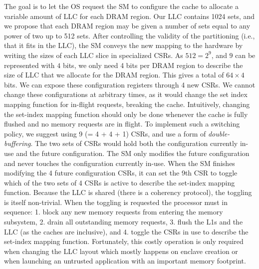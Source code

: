 The goal is to let the OS request the SM to configure the cache to allocate a variable amount of LLC for each DRAM region. Our LLC contains 1024 sets, and we propose that each DRAM region may be given a number of sets equal to any power of two up to 512 sets.
After controlling the validity of the partitioning (i.e., that it fits in the LLC), the SM conveys the new mapping to the hardware by writing the sizes of each LLC slice in specialized CSRs.
As $512=2^9$, and $9$ can be represented with $4$ bits,  we only need 4 bits per DRAM region to describe the size of LLC that we allocate for the DRAM region. This gives a total of $64 \times 4$ bits. We can expose these configuration registers through 4 new CSRs.
We cannot change these configurations at arbitrary times, as it would change the set index mapping function for in-flight requests, breaking the cache.
Intuitively, changing the set-index mapping function should only be done whenever the cache is fully flushed and no memory requests are in flight.
To implement such a switching policy, we suggest using 9 (= 4 + 4 + 1) CSRs, and use a form of \emph{double-buffering}.
The two sets of CSRs would hold both the configuration currently in-use and the future configuration. 
The SM only modifies the future configuration and never touches the configuration currently in-use. 
When the SM finishes modifying the 4 future configuration CSRs, it can set the 9th CSR to toggle which of the two sets of 4 CSRs is active to describe the set-index mapping function.
Because the LLC is shared (there is a coherency protocol), the toggling is itself non-trivial.
When the toggling is requested the processor must in sequence: 1. block any new memory requests from entering the memory subsystem, 2. drain all outstanding memory requests, 3. flush the L1s and the LLC (as the caches are inclusive), and 4. toggle the CSRs in use to describe the set-index mapping function.
Fortunately, this costly operation is only required when changing the LLC layout which mostly happens on enclave creation or when launching an untrusted application with an important memory footprint.

